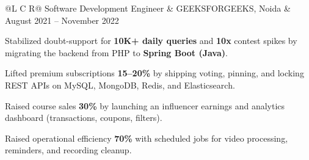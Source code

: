 \vspace{0.1ex}
\noindent
\begin{tabularx}{\textwidth}{@{}L C R@{}}
\textcolor{role}{Software Development Engineer} & \textcolor{company}{GEEKSFORGEEKS, Noida} & \textcolor{date}{August 2021 -- November 2022}\\
\end{tabularx}
\vspace{-3.2ex}
\begin{zitemize}
    \item Stabilized doubt-support for \textbf{10K+ daily queries} and \textbf{10x} contest spikes by migrating the backend from PHP to \textbf{Spring Boot (Java)}.
    \item Lifted premium subscriptions \textbf{15--20\%} by shipping voting, pinning, and locking REST APIs on MySQL, MongoDB, Redis, and Elasticsearch.
    \item Raised course sales \textbf{30\%} by launching an influencer earnings and analytics dashboard (transactions, coupons, filters).
    \item Raised operational efficiency \textbf{70\%} with scheduled jobs for video processing, reminders, and recording cleanup.
\end{zitemize}

